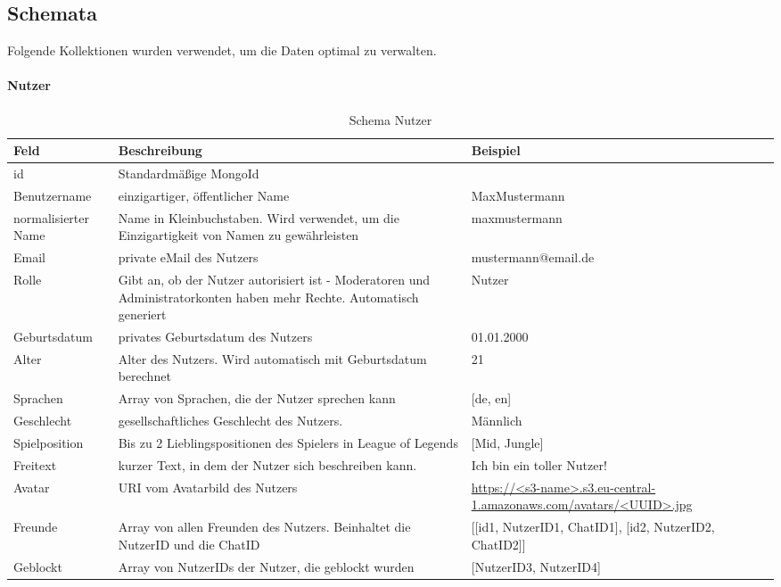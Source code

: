 \subsection{Schemata}
Folgende Kollektionen wurden verwendet, um die Daten optimal zu verwalten.

\paragraph{Nutzer}
\begin{table}
    \centering
    \begin{tabularx}{\textwidth}{ |X|X|X| } 
        \hline
        Feld & Beschreibung & Beispiel \\ 
        \hline
        id & Standardmäßige MongoId & \\
        Benutzername & einzigartiger, öffentlicher Name & MaxMustermann \\ 
        normalisierter Name & Name in Kleinbuchstaben. Wird verwendet, um die Einzigartigkeit von Namen zu gewährleisten & maxmustermann \\ 
        Email & private eMail des Nutzers & mustermann@email.de \\
        Rolle & Gibt an, ob der Nutzer autorisiert ist - Moderatoren und Administratorkonten haben mehr Rechte. Automatisch generiert & Nutzer \\ 
        Geburtsdatum & privates Geburtsdatum des Nutzers & 01.01.2000 \\ 
        Alter & Alter des Nutzers. Wird automatisch mit Geburtsdatum berechnet & 21 \\ 
        Sprachen & Array von Sprachen, die der Nutzer sprechen kann & {[de, en]} \\
        Geschlecht & gesellschaftliches Geschlecht des Nutzers. & Männlich \\ 
        Spielposition & Bis zu 2 Lieblingspositionen des Spielers in League of Legends & {[Mid, Jungle]} \\ 
        Freitext & kurzer Text, in dem der Nutzer sich beschreiben kann. & Ich bin ein toller Nutzer! \\
        Avatar & URI vom Avatarbild des Nutzers & \url{https://<s3-name>.s3.eu-central-1.amazonaws.com/avatars/<UUID>.jpg} \\ 
        Freunde & Array von allen Freunden des Nutzers. Beinhaltet die NutzerID und die ChatID & {[[id1, NutzerID1, ChatID1], [id2, NutzerID2, ChatID2]]}\\ 
        Geblockt & Array von NutzerIDs der Nutzer, die geblockt wurden & {[NutzerID3, NutzerID4]} \\ 
        \hline
    \end{tabularx}
    \caption{Schema Nutzer}
    \label{db:table:nutzer}
\end{table}

